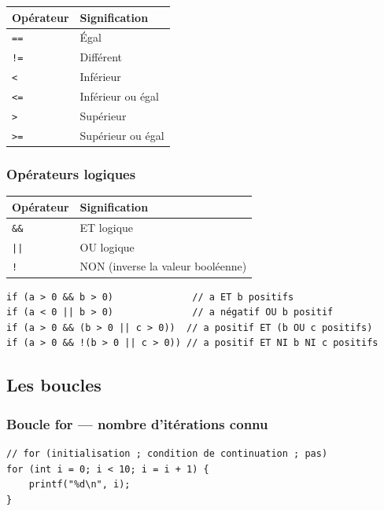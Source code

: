 \documentclass[12pt,a4paper]{article}
\begin{document}
\begin{table}[h!]
\centering
\begin{tabular}{ll}
\toprule
\textbf{Opérateur} & \textbf{Signification} \\
\midrule
\texttt{==} & Égal \\
\texttt{!=} & Différent \\
\texttt{<}  & Inférieur \\
\texttt{<=} & Inférieur ou égal \\
\texttt{>}  & Supérieur \\
\texttt{>=} & Supérieur ou égal \\
\bottomrule
\end{tabular}
\end{table}

\subsubsection{Opérateurs logiques}

\begin{table}[h!]
\centering
\begin{tabular}{ll}
\toprule
\textbf{Opérateur} & \textbf{Signification} \\
\midrule
\texttt{\&\&} & ET logique \\
\texttt{||} & OU logique \\
\texttt{!} & NON (inverse la valeur booléenne) \\
\bottomrule
\end{tabular}
\end{table}

\begin{lstlisting}[caption={Exemples d'opérateurs logiques}]
if (a > 0 && b > 0)              // a ET b positifs
if (a < 0 || b > 0)              // a négatif OU b positif
if (a > 0 && (b > 0 || c > 0))  // a positif ET (b OU c positifs)
if (a > 0 && !(b > 0 || c > 0)) // a positif ET NI b NI c positifs
\end{lstlisting}

\subsection{Les boucles}

\subsubsection{Boucle for — nombre d'itérations connu}

\begin{lstlisting}[caption={Boucle for}]
// for (initialisation ; condition de continuation ; pas)
for (int i = 0; i < 10; i = i + 1) {
    printf("%d\n", i);
}
\end{lstlisting}
\end{document}
